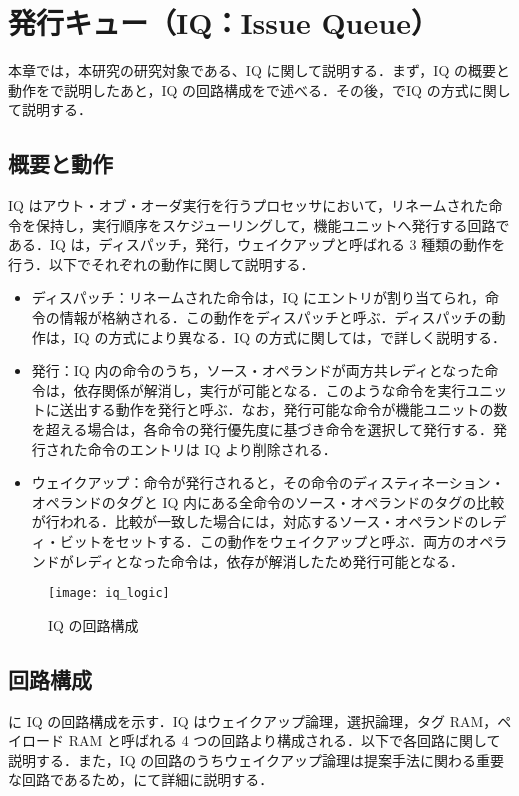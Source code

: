 
\chapter{発行キュー（IQ：Issue Queue）}
\label{sec:basic_IQ}
本章では，本研究の研究対象である、IQ に関して説明する．まず，IQ の概要と動作をで説明したあと，IQ の回路構成をで述べる．その後，でIQ の方式に関して説明する．

\section{概要と動作}
\label{sec:iq_abst}
IQ はアウト・オブ・オーダ実行を行うプロセッサにおいて，リネームされた命令を保持し，実行順序をスケジューリングして，機能ユニットへ発行する回路である．IQ は，ディスパッチ，発行，ウェイクアップと呼ばれる 3 種類の動作を行う．以下でそれぞれの動作に関して説明する．

\begin{itemize}
  \item ディスパッチ：リネームされた命令は，IQ にエントリが割り当てられ，命令の情報が格納される．この動作をディスパッチと呼ぶ．ディスパッチの動作は，IQ の方式により異なる．IQ の方式に関しては，で詳しく説明する．
  \item 発行：IQ 内の命令のうち，ソース・オペランドが両方共レディとなった命令は，依存関係が解消し，実行が可能となる．このような命令を実行ユニットに送出する動作を発行と呼ぶ．なお，発行可能な命令が機能ユニットの数を超える場合は，各命令の発行優先度に基づき命令を選択して発行する．発行された命令のエントリは IQ より削除される． 
  \item ウェイクアップ：命令が発行されると，その命令のディスティネーション・オペランドのタグと IQ 内にある全命令のソース・オペランドのタグの比較が行われる．比較が一致した場合には，対応するソース・オペランドのレディ・ビットをセットする．この動作をウェイクアップと呼ぶ．両方のオペランドがレディとなった命令は，依存が解消したため発行可能となる．
\end{itemize}

\begin{figure}[thb]
  \centering
  \texttt{[image: iq\_logic]}
  \caption{IQ の回路構成}
  \label{fig:iq_logic}
\end{figure}

\section{回路構成}
\label{sec:iq_circuit}
に IQ の回路構成を示す．IQ はウェイクアップ論理，選択論理，タグ RAM，ペイロード RAM と呼ばれる 4 つの回路より構成される．以下で各回路に関して説明する．また，IQ の回路のうちウェイクアップ論理は提案手法に関わる重要な回路であるため，にて詳細に説明する．

